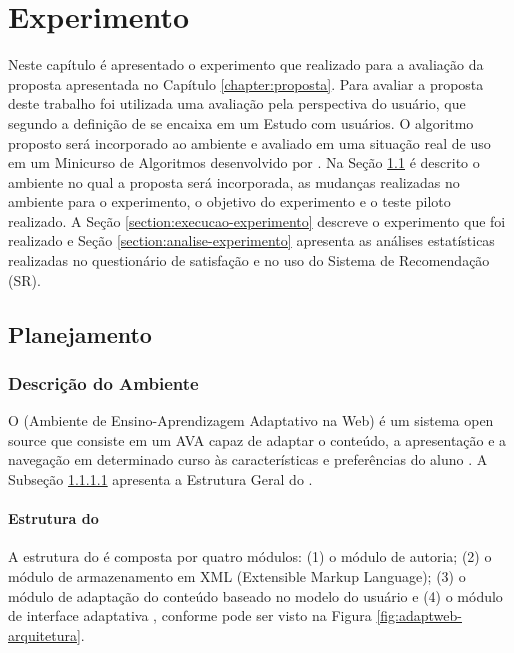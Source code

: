 \chapter{Experimento}\label{chapter:experimento}

Neste capítulo é apresentado o experimento que realizado para a avaliação da proposta apresentada no Capítulo \ref{chapter:proposta}.
Para avaliar a proposta deste trabalho foi utilizada uma avaliação pela perspectiva do usuário, que segundo a definição de
 se encaixa em um Estudo com usuários. O algoritmo proposto será incorporado ao ambiente
\adaptweb e avaliado em uma situação real de uso em um Minicurso de Algoritmos desenvolvido por .
Na Seção \ref{section:planejamento-experimento} é descrito o ambiente \adaptweb no qual a proposta será incorporada,
as mudanças realizadas no ambiente para o experimento, o objetivo do experimento e o teste piloto realizado. A Seção
\ref{section:execucao-experimento} descreve o experimento que foi realizado e Seção \ref{section:analise-experimento} apresenta
as análises estatísticas realizadas no questionário de satisfação e no uso do Sistema de Recomendação (SR).

\section{Planejamento}\label{section:planejamento-experimento}

\subsection{Descrição do Ambiente \adaptweb}

O \adaptweb (Ambiente de Ensino-Aprendizagem Adaptativo na Web) é um sistema open source
que consiste em um AVA capaz de adaptar o conteúdo, a apresentação e a navegação em determinado curso às características
e preferências do aluno \cite{gasparini2009adaptweb}. A Subseção \ref{subsection:estrutura-adaptweb} apresenta a Estrutura Geral do
\adaptweb.

\subsubsection{Estrutura do \adaptweb}\label{subsection:estrutura-adaptweb}

A estrutura do \adaptweb é composta por quatro módulos: (1) o módulo de autoria; (2) o
módulo de armazenamento em XML (Extensible Markup Language); (3) o módulo de adaptação do conteúdo baseado no modelo do
usuário e (4) o módulo de interface adaptativa \cite{gasparini2003interface}, conforme pode ser visto na Figura
\ref{fig:adaptweb-arquitetura}.

